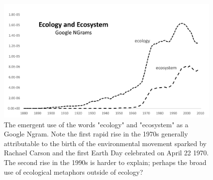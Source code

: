  \begin{figure}[!ht]
  \centering
    \includegraphics[width=5.5in]{figures/ecologyEcosystem}
  \caption{The emergent use of the words "ecology" and "ecosystem" as a Google Ngram. Note the first rapid rise in the 1970s generally attributable to the birth of the environmental movement sparked by Rachael Carson and the first Earth Day celebrated on April 22 1970. The second rise in the 1990s is harder to explain; perhaps the broad use of ecological metaphors outside of ecology?}
\end{figure}
